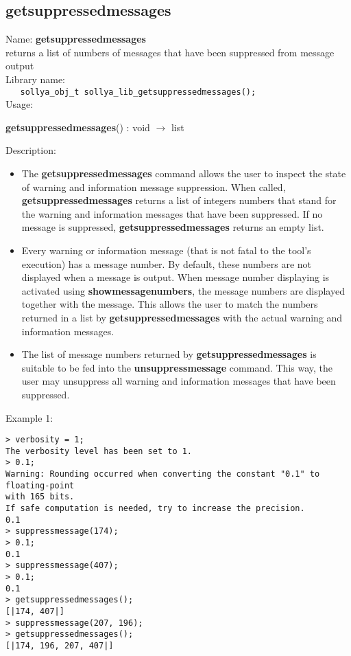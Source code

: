 \subsection{getsuppressedmessages}
\label{labgetsuppressedmessages}
\noindent Name: \textbf{getsuppressedmessages}\\
\phantom{aaa}returns a list of numbers of messages that have been suppressed from message output\\[0.2cm]
\noindent Library name:\\
\verb|   sollya_obj_t sollya_lib_getsuppressedmessages();|\\[0.2cm]
\noindent Usage: 
\begin{center}
\textbf{getsuppressedmessages}()   : \textsf{void} $\rightarrow$ \textsf{list}\\
\end{center}
\noindent Description: \begin{itemize}

\item The \textbf{getsuppressedmessages} command allows the user to inspect the state of warning
   and information message suppression. When called, \textbf{getsuppressedmessages} returns a
   list of integers numbers that stand for the warning and information
   messages that have been suppressed.  If no message is suppressed,
   \textbf{getsuppressedmessages} returns an empty list.

\item Every \sollya warning or information message (that is not fatal to the
   tool's execution) has a message number. By default, these numbers are
   not displayed when a message is output. When message number displaying
   is activated using \textbf{showmessagenumbers}, the message numbers are
   displayed together with the message. This allows the user to match the
   numbers returned in a list by \textbf{getsuppressedmessages} with the actual warning and
   information messages.

\item The list of message numbers returned by \textbf{getsuppressedmessages} is suitable to be fed
   into the \textbf{unsuppressmessage} command. This way, the user may unsuppress
   all warning and information messages that have been suppressed.
\end{itemize}
\noindent Example 1: 
\begin{center}\begin{minipage}{15cm}\begin{Verbatim}[frame=single]
> verbosity = 1;
The verbosity level has been set to 1.
> 0.1;
Warning: Rounding occurred when converting the constant "0.1" to floating-point 
with 165 bits.
If safe computation is needed, try to increase the precision.
0.1
> suppressmessage(174);
> 0.1;
0.1
> suppressmessage(407);
> 0.1;
0.1
> getsuppressedmessages();
[|174, 407|]
> suppressmessage(207, 196);
> getsuppressedmessages();
[|174, 196, 207, 407|]
\end{Verbatim}
\end{minipage}\end{center}
